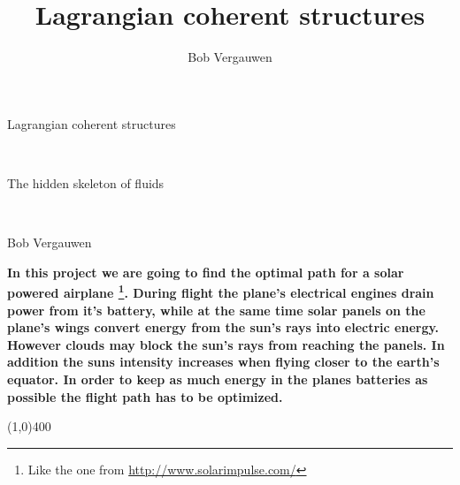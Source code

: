 \documentclass[10pt,a4paper]{article}
\title{Lagrangian coherent structures}
\author{Bob Vergauwen}
\newenvironment{kop}
{\begin{large} \par\bfseries  }
{ \par \vspace{-3mm}\begin{center} \line(1,0){400} \vspace{-2mm} \end{center}
\end{large}}
\begin{document}
\begin{center}
\begin{huge}
Lagrangian coherent structures
\end{huge}\vspace{2mm} \\
\begin{Large}
The hidden skeleton of fluids
\end{Large}\vspace{2mm} \\
\begin{large}
Bob Vergauwen
\end{large}
\end{center}
\vspace{5mm}
\pagestyle{empty}

\begin{kop}
In this project we are going to find the optimal path for a solar powered airplane \footnote{Like the one from \url{http://www.solarimpulse.com/}}. During flight the plane's electrical engines drain power from it's battery, while at the same time solar panels on the plane's wings convert energy from the sun's rays into electric energy. However clouds may block the sun's rays from reaching the panels. In addition the suns intensity increases when flying closer to the earth's equator. In order to keep as much energy in the planes batteries as possible the flight path has to be optimized.


\end{kop}
\end{document}
